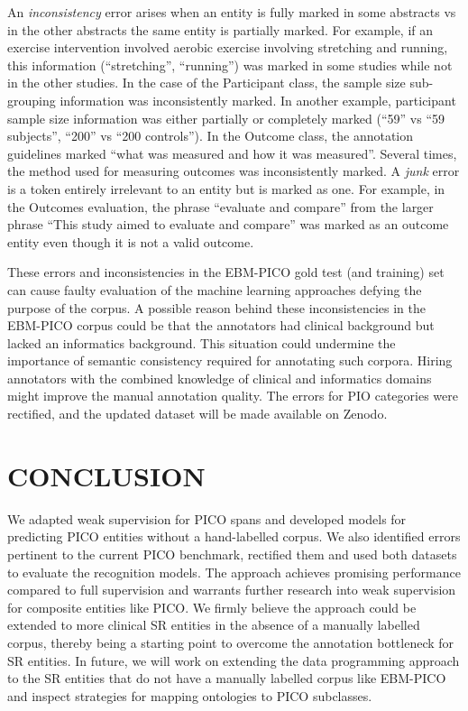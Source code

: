 \documentclass[10.7pt,]{article}
\begin{document}
An \textit{inconsistency} error arises when an entity is fully marked in some abstracts vs in the other abstracts the same entity is partially marked. 
For example, if an exercise intervention involved aerobic exercise involving stretching and running, this information (``stretching'', ``running'') was marked in some studies while not in the other studies.
In the case of the Participant class, the sample size sub-grouping information was inconsistently marked.
In another example, participant sample size information was either partially or completely marked (``59'' vs ``59 subjects'', ``200'' vs ``200 controls'').
In the Outcome class, the annotation guidelines marked ``what was measured and how it was measured''. 
Several times, the method used for measuring outcomes was inconsistently marked.
A \textit{junk} error is a token entirely irrelevant to an entity but is marked as one.
For example, in the Outcomes evaluation, the phrase ``evaluate and compare'' from the larger phrase ``This study aimed to evaluate and compare'' was marked as an outcome entity even though it is not a valid outcome.


These errors and inconsistencies in the EBM-PICO gold test (and training) set can cause faulty evaluation of the machine learning approaches defying the purpose of the corpus.
A possible reason behind these inconsistencies in the EBM-PICO corpus could be that the annotators had clinical background but lacked an informatics background.
This situation could undermine the importance of semantic consistency required for annotating such corpora.
Hiring annotators with the combined knowledge of clinical and informatics domains might improve the manual annotation quality.
The errors for PIO categories were rectified, and the updated dataset will be made available on Zenodo.
%
%
%
\section{CONCLUSION}\label{conclusion}
%
We adapted weak supervision for PICO spans and developed models for predicting PICO entities without a hand-labelled corpus.
We also identified errors pertinent to the current PICO benchmark, rectified them and used both datasets to evaluate the recognition models.
The approach achieves promising performance compared to full supervision and warrants further research into weak supervision for composite entities like PICO.
We firmly believe the approach could be extended to more clinical SR entities in the absence of a manually labelled corpus, thereby being a starting point to overcome the annotation bottleneck for SR entities.
In future, we will work on extending the data programming approach to the SR entities that do not have a manually labelled corpus like EBM-PICO and inspect strategies for mapping ontologies to PICO subclasses.
%
%
%
\end{document}
